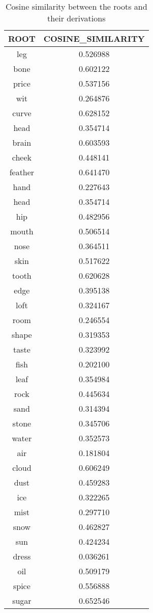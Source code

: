 \documentclass[12pt]{article}
\begin{document}
    \begin{table}[p]
    \begin{center}
        \begin{tabular}{||c c||}
        \hline
        ROOT & COSINE\_SIMILARITY \\
        \hline
        \hline
        leg & 0.526988 \\
        bone & 0.602122 \\
        price & 0.537156 \\
        wit & 0.264876 \\
        curve & 0.628152 \\
        head & 0.354714 \\
        brain & 0.603593 \\
        cheek & 0.448141 \\
        feather & 0.641470 \\
        hand & 0.227643 \\
        head & 0.354714 \\
        hip & 0.482956 \\
        mouth & 0.506514 \\
        nose & 0.364511 \\
        skin & 0.517622 \\
        tooth & 0.620628 \\
        edge & 0.395138 \\
        loft & 0.324167 \\
        room & 0.246554 \\
        shape & 0.319353 \\
        taste & 0.323992 \\
        fish & 0.202100 \\
        leaf & 0.354984 \\
        rock & 0.445634 \\
        sand & 0.314394 \\
        stone & 0.345706 \\
        water & 0.352573 \\
        air & 0.181804 \\
        cloud & 0.606249 \\
        dust & 0.459283 \\
        ice & 0.322265 \\
        mist & 0.297710 \\
        snow & 0.462827 \\
        sun & 0.424234 \\
        dress & 0.036261 \\
        oil & 0.509179 \\
        spice & 0.556888 \\
        sugar & 0.652546 \\
        \hline    
            
        \end{tabular}
    \end{center}
    \caption{ Cosine similarity between the roots and their derivations}
    \end{table}
\end{document}

